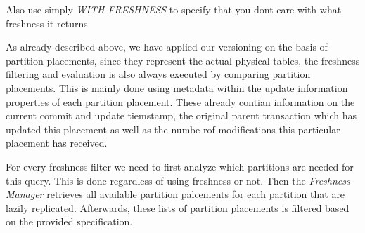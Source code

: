 Also use simply \emph{WITH FRESHNESS} to specify that you dont care with what freshness it returns


As already described above, we have applied our versioning on the basis of partition placements, since they represent the actual physical tables,
the freshness filtering and evaluation is also always executed by comparing partition placements. 
This is mainly done using metadata within the update information properties of each partition placement. These already contian information on the current commit and update tiemstamp,
the original parent transaction which has updated this placement as well as the numbe rof modifications this particular placement has received.

For every freshness filter we need to first analyze which partitions are needed for this query. This is done regardless of using freshness or not.
Then the \textit{Freshness Manager} retrieves all available partition palcements for each partition that are lazily replicated.
Afterwards, these lists of partition placements is filtered based on the provided specification.



